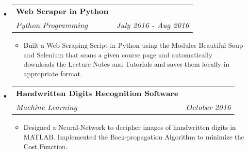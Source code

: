 \documentclass[letterpaper,11pt]{article}
\makeatletter
\newlength{\outerbordwidth}
\newcommand{\resheading}[1]{\vspace{8pt}
  \parbox{\textwidth}{\setlength{\FrameSep}{\outerbordwidth}
    \begin{shaded}
\setlength{\fboxsep}{0pt}\framebox[\textwidth][l]{\setlength{\fboxsep}{4pt}\fcolorbox{shadecolorB}{shadecolorB}{\textbf{\sffamily{\mbox{~}\makebox[6.762in][l]{\large #1} \vphantom{p\^{E}}}}}}
    \end{shaded}
  }\vspace{-5pt}
}
\newcommand{\ressubheading}[4]{
\begin{tabular*}{6.5in}{l@{\extracolsep{\fill}}r}
    \textbf{#1} & #2 \\
    \textit{#3} & \textit{#4} \\
\end{tabular*}\vspace{-6pt}}
\makeatother
\begin{document}
\begin{itemize}
\item
\ressubheading{Web Scraper in Python}{}{Python Programming}{July 2016 - Aug 2016}
\begin{itemize}
\item Built a Web Scraping Script in Python using the Modules Beautiful Soup and Selenium that scans a given course page and automatically downloads the Lecture Notes and Tutorials and saves them locally in appropriate format.
\end{itemize}

\item
\ressubheading{Handwritten Digits Recognition Software}{}{Machine Learning}{October 2016}
\begin{itemize}
\item Designed a Neural-Network to decipher images of handwritten digits in MATLAB. Implemented the Back-propagation Algorithm to minimize the Cost Function.
\end{itemize}
\end{itemize}






\end{document}
